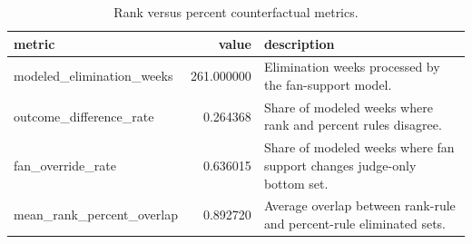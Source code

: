 \begin{table}
\caption{Rank versus percent counterfactual metrics.}
\begin{tabular}{lrl}
\toprule
metric & value & description \\
\midrule
modeled\_elimination\_weeks & 261.000000 & Elimination weeks processed by the fan-support model. \\
outcome\_difference\_rate & 0.264368 & Share of modeled weeks where rank and percent rules disagree. \\
fan\_override\_rate & 0.636015 & Share of modeled weeks where fan support changes judge-only bottom set. \\
mean\_rank\_percent\_overlap & 0.892720 & Average overlap between rank-rule and percent-rule eliminated sets. \\
\bottomrule
\end{tabular}
\end{table}
